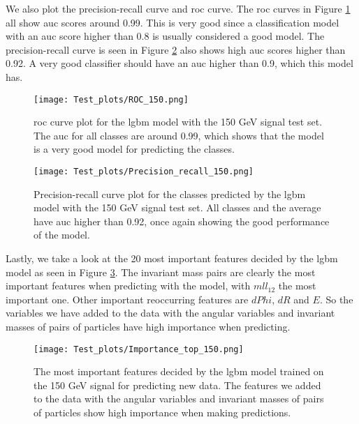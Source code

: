 \documentclass[a4paper, american, 12pt]{report}
\begin{document}
	We also plot the precision-recall curve and \acrshort{roc} curve. The \acrshort{roc} curves in Figure \ref{fig:ROCTest_150} all show \acrshort{auc} scores around 0.99. This is very good since a classification model with an \acrshort{auc} score higher than 0.8 is usually considered a good model. The precision-recall curve is seen in Figure \ref{fig:PrecisionRecallTest_150} also shows high \acrshort{auc} scores higher than 0.92. A very good classifier should have an \acrshort{auc} higher than 0.9, which this model has.
	\begin{figure}[h!tb]
		\centering\texttt{[image: Test\_plots/ROC\_150.png]}
		\caption[Test set \acrshort{roc} plot for the \acrshort{lgbm} model trained on the 150 GeV signal.]{\acrshort{roc} curve plot for the \acrshort{lgbm} model with the 150 GeV signal test set. The \acrshort{auc} for all classes are around 0.99, which shows that the model is a very good model for predicting the classes. \label{fig:ROCTest_150}}
	\end{figure}
	\begin{figure}[h!tb]
		\centering\texttt{[image: Test\_plots/Precision\_recall\_150.png]}
		\caption[Test set precision-recall plot for the \acrshort{lgbm} model trained on the 150 GeV signal.]{Precision-recall curve plot for the classes predicted by the \acrshort{lgbm} model with the 150 GeV signal test set. All classes and the average have \acrshort{auc} higher than 0.92, once again showing the good performance of the model. \label{fig:PrecisionRecallTest_150}}
	\end{figure}
	
	Lastly, we take a look at the 20 most important features decided by the \acrshort{lgbm} model as seen in Figure \ref{fig:ImpTop_150}. The invariant mass pairs are clearly the most important features when predicting with the model, with $mll_12$ the most important one. Other important reoccurring features are $dPhi$, $dR$ and $E$. So the variables we have added to the data with the angular variables and invariant masses of pairs of particles have high importance when predicting.
	\begin{figure}[htb!]
		\centering\texttt{[image: Test\_plots/Importance\_top\_150.png]}
		\caption[Test set most important features of the \acrshort{lgbm} model trained on the 150 GeV signal.]{The most important features decided by the \acrshort{lgbm} model trained on the 150 GeV signal for predicting new data. The features we added to the data with the angular variables and invariant masses of pairs of particles show high importance when making predictions. \label{fig:ImpTop_150}}
	\end{figure}
\end{document}
